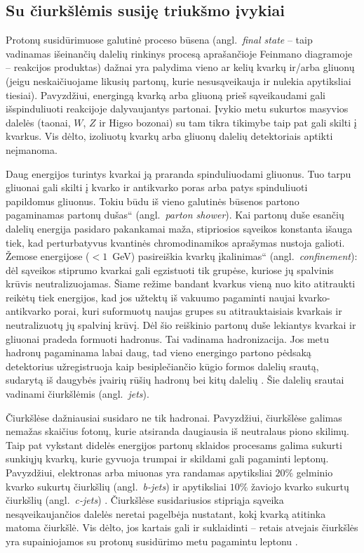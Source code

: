\documentclass[a4paper, 12pt, oneside]{article}
\newcommand{\ltq}[1]{{\quotedblbase{}#1\textquotedblleft{}}}
\newlength\q
\begin{document}
\subsection{Su čiurkšlėmis susiję triukšmo įvykiai}\label{sec:jets}
Protonų susidūrimuose galutinė proceso būsena (angl.\ \textit{final state} -- taip vadinamas išeinančių dalelių rinkinys
procesą aprašančioje Feinmano diagramoje -- reakcijos produktas) dažnai yra palydima vieno ar kelių kvarkų ir/arba gliuonų
(jeigu neskaičiuojame likusių partonų, kurie nesusąveikauja ir nulekia apytiksliai tiesiai).
Pavyzdžiui, energingą kvarką arba gliuoną prieš sąveikaudami gali išspinduliuoti reakcijoje dalyvaujantys partonai.
Įvykio metu sukurtos masyvios dalelės (taonai, $W$, $Z$ ir Higso bozonai) su tam tikra tikimybe taip pat gali skilti į kvarkus.
Vis dėlto, izoliuotų kvarkų arba gliuonų dalelių detektoriais aptikti neįmanoma.

Daug energijos turintys kvarkai ją praranda spinduliuodami gliuonus.
Tuo tarpu gliuonai gali skilti į kvarko ir antikvarko poras arba patys spinduliuoti papildomus gliuonus.
Tokiu būdu iš vieno galutinės būsenos partono pagaminamas \ltq{partonų dušas} (angl.\ \textit{parton shower}).
Kai partonų duše esančių dalelių energija pasidaro pakankamai maža, stipriosios sąveikos konstanta išauga
tiek, kad perturbatyvus kvantinės chromodinamikos aprašymas nustoja galioti.
Žemose energijose ($<\!1$~GeV) pasireiškia kvarkų \ltq{įkalinimas} (angl.\ \textit{confinement}): dėl sąveikos stiprumo
kvarkai gali egzistuoti tik grupėse, kuriose jų spalvinis krūvis neutralizuojamas.
Šiame režime bandant kvarkus vieną nuo kito atitraukti reikėtų tiek energijos, kad jos užtektų iš vakuumo pagaminti
naujai kvarko-antikvarko porai, kuri suformuotų naujas grupes su atitrauktaisiais kvarkais ir neutralizuotų jų spalvinį krūvį.
Dėl šio reiškinio partonų duše lekiantys kvarkai ir gliuonai pradeda formuoti hadronus.
Tai vadinama hadronizacija.
Jos metu hadronų pagaminama labai daug, tad vieno energingo partono pėdsaką detektorius užregistruoja kaip besiplečiančio
kūgio formos dalelių srautą, sudarytą iš daugybės įvairių rūšių hadronų bei kitų dalelių \cite{Jets}.
Šie dalelių srautai vadinami čiurkšlėmis (angl.\ \textit{jets}).

Čiurkšlėse dažniausiai susidaro ne tik hadronai.
Pavyzdžiui, čiurkšlėse galimas nemažas skaičius fotonų, kurie atsiranda daugiausia iš neutralaus piono skilimų.
Taip pat vykstant didelės energijos partonų sklaidos procesams galima sukurti sunkiųjų kvarkų, kurie gyvuoja trumpai
ir skildami gali pagaminti leptonų.
Pavyzdžiui, elektronas arba miuonas yra randamas apytiksliai $20\%$ gelminio kvarko sukurtų čiurkšlių
(angl.\ \textit{b-jets}) ir apytiksliai $10\%$ žaviojo kvarko sukurtų čiurkšlių (angl.\ \textit{c-jets}) \cite{LeptonJets}.
Čiurkšlėse susidariusios stipriąja sąveika nesąveikaujančios dalelės neretai pagelbėja nustatant,
kokį kvarką atitinka matoma čiurkšlė.
Vis dėlto, jos kartais gali ir suklaidinti -- retais atvejais čiurkšlės yra supainiojamos su protonų susidūrimo metu
pagamintu leptonu
\cite{DY_CMS2011, DY_CMS2013, DY_ATLAS2013, DY_ATLAS2014, DY_CMS2015, DY_ATLAS2016, DY_ATLAS2017, DY_CMS2019, EleID, MuonID}.
\end{document}
